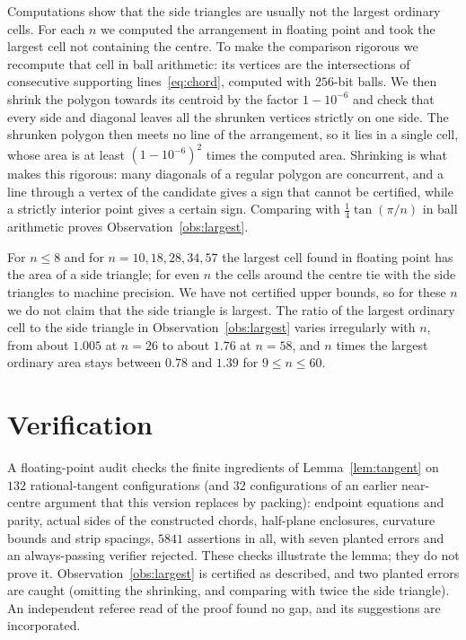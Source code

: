 \documentclass[11pt]{amsart}
\theoremstyle{remark}
\begin{document}
Computations show that the side triangles are usually not the largest ordinary cells. For each $n$ we computed the arrangement in floating point and took the largest cell not containing the centre. To make the comparison rigorous we recompute that cell in ball arithmetic: its vertices are the intersections of consecutive supporting lines~\eqref{eq:chord}, computed with $256$-bit balls. We then shrink the polygon towards its centroid by the factor $1-10^{-6}$ and check that every side and diagonal leaves all the shrunken vertices strictly on one side. The shrunken polygon then meets no line of the arrangement, so it lies in a single cell, whose area is at least $(1-10^{-6})^2$ times the computed area. Shrinking is what makes this rigorous: many diagonals of a regular polygon are concurrent, and a line through a vertex of the candidate gives a sign that cannot be certified, while a strictly interior point gives a certain sign. Comparing with $\frac14\tan(\pi/n)$ in ball arithmetic proves Observation~\ref{obs:largest}.

For $n\le8$ and for $n=10,18,28,34,57$ the largest cell found in floating point has the area of a side triangle; for even $n$ the cells around the centre tie with the side triangles to machine precision. We have not certified upper bounds, so for these $n$ we do not claim that the side triangle is largest. The ratio of the largest ordinary cell to the side triangle in Observation~\ref{obs:largest} varies irregularly with $n$, from about $1.005$ at $n=26$ to about $1.76$ at $n=58$, and $n$ times the largest ordinary area stays between $0.78$ and $1.39$ for $9\le n\le60$.

\section{Verification}

A floating-point audit checks the finite ingredients of Lemma~\ref{lem:tangent} on $132$ rational-tangent configurations (and $32$ configurations of an earlier near-centre argument that this version replaces by packing): endpoint equations and parity, actual sides of the constructed chords, half-plane enclosures, curvature bounds and strip spacings, $5841$ assertions in all, with seven planted errors and an always-passing verifier rejected. These checks illustrate the lemma; they do not prove it. Observation~\ref{obs:largest} is certified as described, and two planted errors are caught (omitting the shrinking, and comparing with twice the side triangle). An independent referee read of the proof found no gap, and its suggestions are incorporated.
\end{document}
